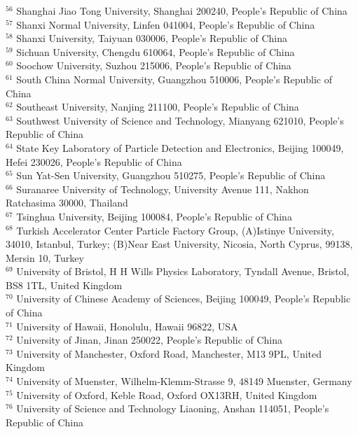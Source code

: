 \documentclass[prd,aps,reprint,noeprint,superscriptaddress,amsmath, amssymb]{revtex4-1}
\begin{document}
\begin{widetext}
\begin{center}
{$^{56}$ Shanghai Jiao Tong University, Shanghai 200240, People's Republic of China\\
$^{57}$ Shanxi Normal University, Linfen 041004, People's Republic of China\\
$^{58}$ Shanxi University, Taiyuan 030006, People's Republic of China\\
$^{59}$ Sichuan University, Chengdu 610064, People's Republic of China\\
$^{60}$ Soochow University, Suzhou 215006, People's Republic of China\\
$^{61}$ South China Normal University, Guangzhou 510006, People's Republic of China\\
$^{62}$ Southeast University, Nanjing 211100, People's Republic of China\\
$^{63}$ Southwest University of Science and Technology, Mianyang 621010, People's Republic of China\\
$^{64}$ State Key Laboratory of Particle Detection and Electronics, Beijing 100049, Hefei 230026, People's Republic of China\\
$^{65}$ Sun Yat-Sen University, Guangzhou 510275, People's Republic of China\\
$^{66}$ Suranaree University of Technology, University Avenue 111, Nakhon Ratchasima 30000, Thailand\\
$^{67}$ Tsinghua University, Beijing 100084, People's Republic of China\\
$^{68}$ Turkish Accelerator Center Particle Factory Group, (A)Istinye University, 34010, Istanbul, Turkey; (B)Near East University, Nicosia, North Cyprus, 99138, Mersin 10, Turkey\\
$^{69}$ University of Bristol, H H Wills Physics Laboratory, Tyndall Avenue, Bristol, BS8 1TL, United Kingdom\\
$^{70}$ University of Chinese Academy of Sciences, Beijing 100049, People's Republic of China\\
$^{71}$ University of Hawaii, Honolulu, Hawaii 96822, USA\\
$^{72}$ University of Jinan, Jinan 250022, People's Republic of China\\
$^{73}$ University of Manchester, Oxford Road, Manchester, M13 9PL, United Kingdom\\
$^{74}$ University of Muenster, Wilhelm-Klemm-Strasse 9, 48149 Muenster, Germany\\
$^{75}$ University of Oxford, Keble Road, Oxford OX13RH, United Kingdom\\
$^{76}$ University of Science and Technology Liaoning, Anshan 114051, People's Republic of China\\
}
\end{center}
\end{widetext}
\end{document}
